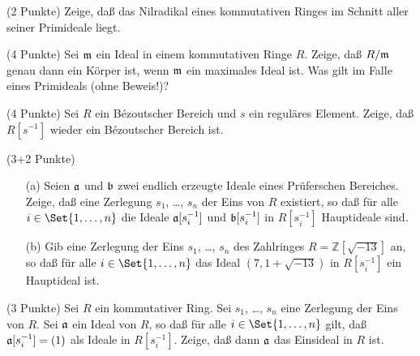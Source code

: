 \documentclass{algsheet}
\author{Dipl.-Math.~Franz Vogler}
\date{04.~Juli 2011}
\begin{document}
                \maketitle



\begin{exercise}(2 Punkte)\newline
    Zeige, daß das Nilradikal eines kommutativen Ringes im Schnitt aller seiner
    Primideale liegt.
\end{exercise}

\begin{exercise}(4 Punkte)\newline
    Sei \(\mathfrak{m}\) ein Ideal in einem kommutativen Ringe \(R\).
    Zeige, daß \(R/\mathfrak{m}\) genau dann ein Körper ist, wenn $\mathfrak{m}$ ein maximales Ideal ist. 
    \newline
    Was gilt im Falle eines Primideals (ohne Beweis!)?
\end{exercise}


\begin{exercise}(4 Punkte)\newline
  Sei \(R\) ein Bézoutscher Bereich und \(s\) ein reguläres Element. Zeige, daß
  \(R[s^{-1}]\) wieder ein Bézoutscher Bereich ist.
\end{exercise}

\begin{exercise}(3+2 Punkte)\vspace{-1ex}
  \begin{itemize}
   \item [(a)] 
    Seien \(\mathfrak{a}\) und \(\mathfrak{b}\) zwei endlich erzeugte Ideale eines
    Prüferschen Bereiches. Zeige, daß eine Zerlegung \(s_1\), \dots, \(s_n\)
    der Eins von \(R\) existiert, so daß für alle \(i \in \Set{1, \dotsc, n}\)
    die Ideale \(\mathfrak{a}[s_i^{-1}]\) und \(\mathfrak{b}[s_i^{-1}]\) in \(R[s_i^{-1}]\)
    Hauptideale sind.
   \item [(b)]     Gib eine Zerlegung der Eins \(s_1\), \dots, \(s_n\) des Zahlringes
    \(R = \mathbb Z[\sqrt{-13}]\) an, so daß für alle \(i \in \Set{1, \dotsc, n}\)
    das Ideal \((7, 1 + \sqrt{-13})\) in \(R[s_i^{-1}]\) ein Hauptideal ist.
  \end{itemize}
\end{exercise} 

\begin{exercise}(3 Punkte)\newline
    Sei \(R\) ein kommutativer Ring. Sei \(s_1\), \dots, \(s_n\) eine Zerlegung
    der Eins von \(R\). Sei \(\mathfrak{a}\) ein Ideal von \(R\), so daß für alle
    \(i \in \Set{1, \dotsc, n}\) gilt, daß \(\mathfrak{a}[s_i^{-1}] = (1)\) als
    Ideale in \(R[s_i^{-1}]\). Zeige, daß dann \(\mathfrak{a}\) das Einsideal in
    \(R\) ist.
\end{exercise}
\end{document}

